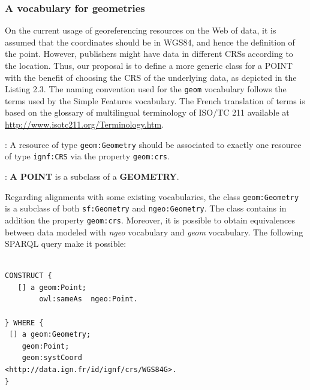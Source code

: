 \subsubsection{A vocabulary for geometries} \label{sec:geomvocab}

On the current usage of georeferencing resources on the Web of data, it is assumed that the coordinates should be in WGS84, and hence the definition of the point. However, publishers might have data in different CRSs according to the location. Thus, our proposal is to define a more generic class for a POINT  with the benefit of choosing the CRS of the underlying data, as depicted in the Listing 2.3. 
The naming convention used for the \texttt{geom} vocabulary follows the terms used by the Simple Features vocabulary. The French translation of terms is based on the glossary of multilingual terminology of ISO/TC 211 available at \url{http://www.isotc211.org/Terminology.htm}.

\begin{deflda}:
A resource of type \texttt{geom:Geometry} should be associated to exactly one resource of type \texttt{ignf:CRS} via the property \texttt{geom:crs}.
\end{deflda}

\begin{deflda}:
\textbf{A POINT} is a subclass of a \textbf{GEOMETRY}.
\end{deflda}

Regarding alignments with some existing vocabularies, the class \texttt{geom:Geometry} is a subclass of both \texttt{sf:Geometry} and \texttt{ngeo:Geometry}. The class contains in addition the property \texttt{geom:crs}. Moreover, it is possible to obtain equivalences between data modeled with \emph{ngeo} vocabulary and \emph{geom} vocabulary. The following SPARQL query make it possible:

\begin{lstlisting}

CONSTRUCT {
   [] a geom:Point;
    	owl:sameAs  ngeo:Point.
 
} WHERE {
 [] a geom:Geometry;
	geom:Point;
	geom:systCoord
<http://data.ign.fr/id/ignf/crs/WGS84G>.
}

\end{lstlisting}


